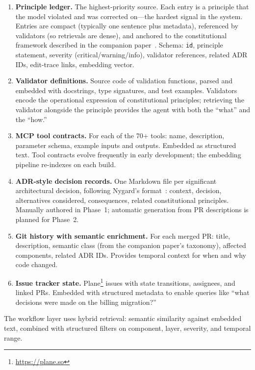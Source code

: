 \documentclass[11pt]{article}
\begin{document}
\begin{enumerate}[leftmargin=*, nosep]
  \item \textbf{Principle ledger.} The highest-priority source. Each entry is a principle that the model violated and was corrected on---the hardest signal in the system. Entries are compact (typically one sentence plus metadata), referenced by validators (so retrievals are dense), and anchored to the constitutional framework described in the companion paper~\citep[\S5]{ovcharov2026recursive}. Schema: \texttt{id}, principle statement, severity (critical/warning/info), validator references, related ADR IDs, edit-trace links, embedding vector.

  \item \textbf{Validator definitions.} Source code of validation functions, parsed and embedded with docstrings, type signatures, and test examples. Validators encode the operational expression of constitutional principles; retrieving the validator alongside the principle provides the agent with both the ``what'' and the ``how.''

  \item \textbf{MCP tool contracts.} For each of the 70+ tools: name, description, parameter schema, example inputs and outputs. Embedded as structured text. Tool contracts evolve frequently in early development; the embedding pipeline re-indexes on each build.

  \item \textbf{ADR-style decision records.} One Markdown file per significant architectural decision, following Nygard's format~\citep{nygard2011adr}: context, decision, alternatives considered, consequences, related constitutional principles. Manually authored in Phase~1; automatic generation from PR descriptions is planned for Phase~2.

  \item \textbf{Git history with semantic enrichment.} For each merged PR: title, description, semantic class (from the companion paper's taxonomy), affected components, related ADR IDs. Provides temporal context for when and why code changed.

  \item \textbf{Issue tracker state.} Plane\footnote{\url{https://plane.so}} issues with state transitions, assignees, and linked PRs. Embedded with structured metadata to enable queries like ``what decisions were made on the billing migration?''
\end{enumerate}

The workflow layer uses hybrid retrieval: semantic similarity against embedded text, combined with structured filters on component, layer, severity, and temporal range.
\end{document}
